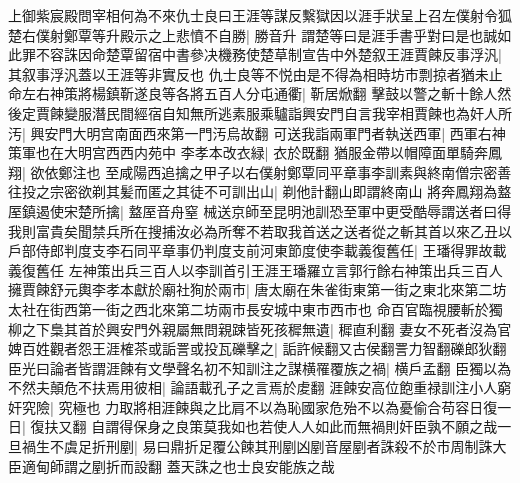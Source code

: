 上御紫宸殿問宰相何為不來仇士良曰王涯等謀反繫獄因以涯手狀呈上召左僕射令狐楚右僕射鄭覃等升殿示之上悲憤不自勝|{
	勝音升}
謂楚等曰是涯手書乎對曰是也誠如此罪不容誅因命楚覃留宿中書參决機務使楚草制宣告中外楚叙王涯賈餗反事浮汎|{
	其叙事浮汎蓋以王涯等非實反也}
仇士良等不悦由是不得為相時坊市剽掠者猶未止命左右神策將楊鎮靳遂良等各將五百人分屯通衢|{
	靳居焮翻}
擊鼓以警之斬十餘人然後定賈餗變服潛民間經宿自知無所逃素服乘驢詣興安門自言我宰相賈餗也為奸人所汚|{
	興安門大明宫南面西來第一門汚烏故翻}
可送我詣兩軍門者執送西軍|{
	西軍右神策軍也在大明宫西西内苑中}
李孝本改衣緑|{
	衣於既翻}
猶服金帶以帽障面單騎奔鳳翔|{
	欲依鄭注也}
至咸陽西追擒之甲子以右僕射鄭覃同平章事李訓素與終南僧宗密善往投之宗密欲剃其髪而匿之其徒不可訓出山|{
	剃他計翻山即謂終南山}
將奔鳳翔為盩厔鎮遏使宋楚所擒|{
	盩厔音舟窒}
械送京師至昆明池訓恐至軍中更受酷辱謂送者曰得我則富貴矣聞禁兵所在搜捕汝必為所奪不若取我首送之送者從之斬其首以來乙丑以戶部侍郎判度支李石同平章事仍判度支前河東節度使李載義復舊任|{
	王璠得罪故載義復舊任}
左神策出兵三百人以李訓首引王涯王璠羅立言郭行餘右神策出兵三百人擁賈餗舒元輿李孝本獻於廟社狥於兩市|{
	唐太廟在朱雀街東第一街之東北來第二坊太社在街西第一街之西北來第二坊兩市長安城中東市西市也}
命百官臨視腰斬於獨柳之下梟其首於興安門外親屬無問親踈皆死孩穉無遺|{
	穉直利翻}
妻女不死者沒為官婢百姓觀者怨王涯榷茶或詬詈或投瓦礫擊之|{
	詬許候翻又古侯翻詈力智翻礫郎狄翻}
臣光曰論者皆謂涯餗有文學聲名初不知訓注之謀横罹覆族之禍|{
	横戶孟翻}
臣獨以為不然夫顛危不扶焉用彼相|{
	論語載孔子之言焉於䖍翻}
涯餗安高位飽重禄訓注小人窮奸究險|{
	究極也}
力取將相涯餗與之比肩不以為恥國家危殆不以為憂偷合苟容日復一日|{
	復扶又翻}
自謂得保身之良策莫我如也若使人人如此而無禍則奸臣孰不願之哉一旦禍生不虞足折刑剭|{
	易曰鼎折足覆公餗其刑剭凶剭音屋剭者誅殺不於市周制誅大臣適甸師謂之剭折而設翻}
蓋天誅之也士良安能族之哉

